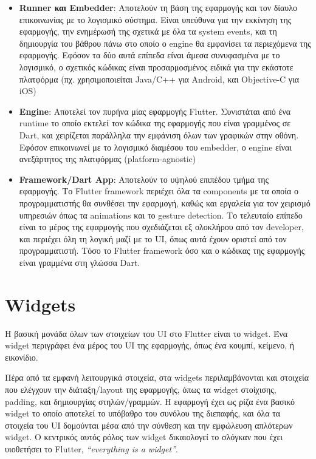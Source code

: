 \documentclass[../thesis.tex]{subfiles}
\begin{document}
\begin{itemize}
    \item \textbf{Runner και Embedder}: Αποτελούν τη βάση της εφαρμογής και τον δίαυλο επικοινωνίας με το λογισμικό σύστημα.
    Είναι υπεύθυνα για την εκκίνηση της εφαρμογής, την ενημέρωσή της σχετικά με όλα τα system events, και τη δημιουργία του βάθρου πάνω στο οποίο ο engine θα εμφανίσει τα περιεχόμενα της εφαρμογής.
    Εφόσον τα δύο αυτά επίπεδα είναι άμεσα συνυφασμένα με το λογισμικό, ο σχετικός κώδικας είναι προσαρμοσμένος ειδικά για την εκάστοτε πλατφόρμα (πχ. χρησιμοποιείται Java/C++ για Android, και Objective-C για iOS)
    \item \textbf{Engine}: Αποτελεί τον πυρήνα μίας εφαρμογής Flutter. Συνιστάται από ένα runtime το οποίο εκτελεί τον κώδικα της εφαρμογής που είναι γραμμένος σε Dart, και χειρίζεται παράλληλα την εμφάνιση όλων των γραφικών στην οθόνη.
    Εφόσον επικοινωνεί με το λογισμικό διαμέσου του embedder, ο engine είναι ανεξάρτητος της πλατφόρμας (platform-agnostic)
    \item \textbf{Framework/Dart App}: Αποτελούν το υψηλού επιπέδου τμήμα της εφαρμογής.
    Το Flutter framework περιέχει όλα τα components με τα οποία ο προγραμματιστής θα συνθέσει την εφαρμογή, καθώς και εργαλεία για τον χειρισμό υπηρεσιών όπως τα animations και το gesture detection.
    Το τελευταίο επίπεδο είναι το μέρος της εφαρμογής που σχεδιάζεται εξ ολοκλήρου από τον developer, και περιέχει όλη τη λογική μαζί με το UI, όπως αυτά έχουν οριστεί από τον προγραμματιστή.
    Τόσο το Flutter framework όσο και ο κώδικας της εφαρμογής είναι γραμμένα στη γλώσσα Dart.
\end{itemize}

\section{Widgets}
Η βασική μονάδα όλων των στοιχείων του UI στο Flutter είναι το widget.
Ένα widget περιγράφει ένα μέρος του UI της εφαρμογής, όπως ένα κουμπί, κείμενο, ή εικονίδιο.

Πέρα από τα εμφανή λειτουργικά στοιχεία, στα widgets περιλαμβάνονται και στοιχεία που ελέγχουν την διάταξη/layout της εφαρμογής, όπως τα widget στοίχισης, padding, και δημιουργίας στηλών/γραμμών.
Η εφαρμογή έχει ως ρίζα ένα βασικό widget το οποίο αποτελεί το υπόβαθρο του συνόλου της διεπαφής, και όλα τα στοιχεία του UI δομούνται μέσα από την σύνθεση και την εμφώλευση απλότερων widget.
Ο κεντρικός αυτός ρόλος των widget δικαιολογεί το σλόγκαν που έχει υιοθετήσει το Flutter, \textit{``everything is a widget''}.
\end{document}
